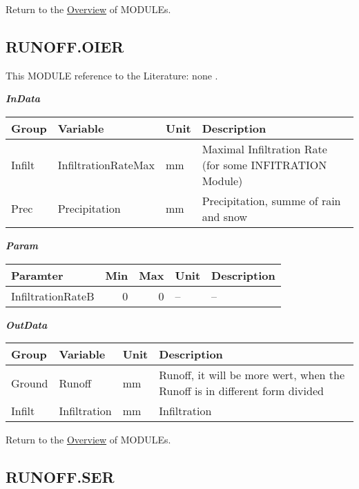 \documentclass[
]{book}
\begin{document}
Return to the \protect\hyperlink{module}{Overview} of MODULEs.

\hypertarget{RUNOFF.OIER}{%
\subsection{RUNOFF.OIER}\label{RUNOFF.OIER}}

This MODULE reference to the Literature: none \citep{none}.

\textbf{\emph{InData}}

\begin{table}[!h]
\centering
\begin{tabular}{l|l|l|l}
\hline
Group & Variable & Unit & Description\\
\hline
Infilt & InfiltrationRateMax & mm & Maximal Infiltration Rate (for some INFITRATION Module)\\
\cline{1-4}
Prec & Precipitation & mm & Precipitation, summe of rain and snow\\
\hline
\end{tabular}
\end{table}

\textbf{\emph{Param}}

\begin{table}[!h]
\centering
\begin{tabular}{l|r|r|l|l}
\hline
Paramter & Min & Max & Unit & Description\\
\hline
InfiltrationRateB & 0 & 0 & -- & --\\
\hline
\end{tabular}
\end{table}

\textbf{\emph{OutData}}

\begin{table}[!h]
\centering
\begin{tabular}{l|l|l|l}
\hline
Group & Variable & Unit & Description\\
\hline
Ground & Runoff & mm & Runoff, it will be more wert, when the Runoff is in different form divided\\
\cline{1-4}
Infilt & Infiltration & mm & Infiltration\\
\hline
\end{tabular}
\end{table}

Return to the \protect\hyperlink{module}{Overview} of MODULEs.

\hypertarget{RUNOFF.SER}{%
\subsection{RUNOFF.SER}\label{RUNOFF.SER}}
\end{document}
